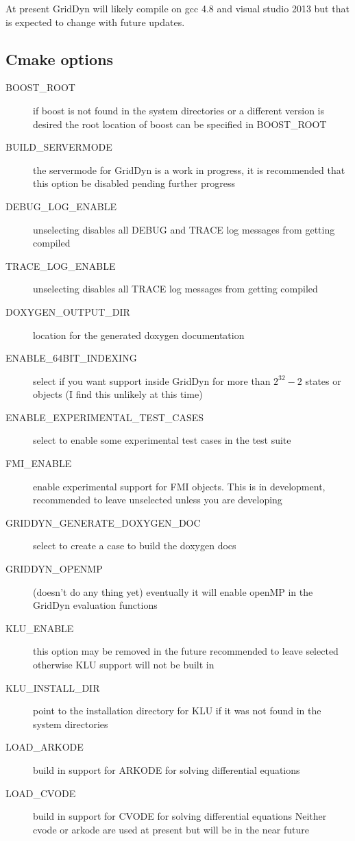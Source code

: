 \documentclass[12pt]{article} %
\begin{document}
At present GridDyn will likely compile on gcc 4.8 and visual studio 2013 but that is expected to change with future updates.
\subsection {Cmake options}
\begin{description}
\item [BOOST\_ROOT]  if boost is not found in the system directories or a different version is desired the root location of boost can be specified in BOOST\_ROOT
\item [BUILD\_SERVERMODE]  the servermode for GridDyn is a work in progress, it is recommended that this option be disabled pending further progress
\item [DEBUG\_LOG\_ENABLE] unselecting disables all DEBUG and TRACE log messages from getting compiled
\item [TRACE\_LOG\_ENABLE] unselecting disables all TRACE log messages from getting compiled
\item [DOXYGEN\_OUTPUT\_DIR] location for the generated doxygen documentation
\item [ENABLE\_64BIT\_INDEXING]  select if you want support inside GridDyn for more than $2^{32}-2$ states or objects (I find this unlikely at this time)
\item [ENABLE\_EXPERIMENTAL\_TEST\_CASES]  select to enable some experimental test cases in the test suite
\item [FMI\_ENABLE] enable experimental support for FMI objects.  This is in development,  recommended to leave unselected unless you are developing
\item [GRIDDYN\_GENERATE\_DOXYGEN\_DOC]  select to create a case to build the doxygen docs{\tiny }
\item [GRIDDYN\_OPENMP] (doesn't do any thing yet) eventually it will enable openMP in the GridDyn evaluation functions
\item [KLU\_ENABLE] this option may be removed in the future recommended to leave selected otherwise KLU support will not be built in
\item [KLU\_INSTALL\_DIR]  point to the installation directory for KLU if it was not found in the system directories
\item [LOAD\_ARKODE] build in support for ARKODE for solving differential equations
\item [LOAD\_CVODE] build in support for CVODE for solving differential equations Neither cvode or arkode are used at present but will be in the near future

\end{description}
\end{document}
